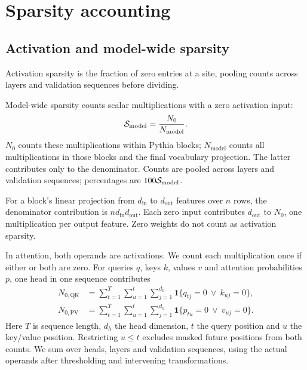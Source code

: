 \section{Sparsity accounting}
\label{app:accounting}

\subsection{Activation and model-wide sparsity}

Activation sparsity is the fraction of zero entries at a site, pooling
counts across layers and validation sequences before dividing.

Model-wide sparsity counts scalar multiplications with a zero activation input:
\begin{equation}
\mathcal{S}_{\mathrm{model}}=\frac{N_0}{N_{\mathrm{model}}}.
\end{equation}
$N_0$ counts these multiplications within Pythia blocks;
$N_{\mathrm{model}}$ counts all multiplications in those blocks and the
final vocabulary projection. The latter contributes only to the denominator.
Counts are pooled across layers and validation sequences; percentages are
$100\mathcal{S}_{\mathrm{model}}$.

For a block's linear projection from $d_{\mathrm{in}}$ to
$d_{\mathrm{out}}$ features over $n$ rows, the denominator contribution is
$n d_{\mathrm{in}}d_{\mathrm{out}}$. Each zero input contributes
$d_{\mathrm{out}}$ to $N_0$, one multiplication per output feature.
Zero weights do not count as activation sparsity.

In attention, both operands are activations. We count each multiplication
once if either or both are zero. For queries $q$, keys $k$, values $v$ and
attention probabilities $p$, one head in one sequence contributes
\begin{align}
N_{0,\mathrm{QK}}&=\sum_{t=1}^{T}\sum_{u=1}^{t}\sum_{j=1}^{d_h}
\mathbf{1}\{q_{tj}=0\ \lor\ k_{uj}=0\},\label{eq:qk-count}\\
N_{0,\mathrm{PV}}&=\sum_{t=1}^{T}\sum_{u=1}^{t}\sum_{j=1}^{d_h}
\mathbf{1}\{p_{tu}=0\ \lor\ v_{uj}=0\}.\label{eq:pv-count}
\end{align}
Here $T$ is sequence length, $d_h$ the head dimension, $t$ the query position
and $u$ the key/value position. Restricting $u\leq t$ excludes masked future
positions from both counts. We sum over heads, layers and validation sequences,
using the actual operands after thresholding and intervening transformations.

